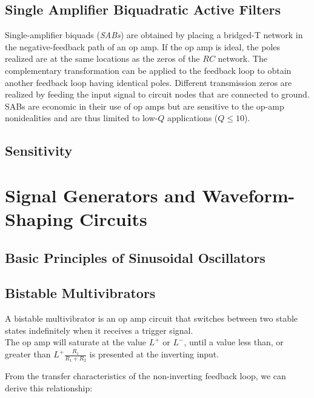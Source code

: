 \documentclass[11pt]{article}
\begin{document}
    \subsection{Single Amplifier Biquadratic Active Filters}

    Single-amplifier biquads (\textit{SABs}) are obtained by placing a bridged-T network in the negative-feedback path of an op amp. If the op amp is ideal, the poles realized are at the same locations as the zeros of the $RC$ network. The complementary transformation can be applied to the feedback loop to obtain another feedback loop having identical poles. Different transmission zeros are realized by feeding the input signal to circuit nodes that are connected to ground. SABs are economic in their use of op amps but are sensitive to the op-amp nonidealities and
    are thus limited to low-$Q$ applications ($Q \leq 10$).

    \subsection{Sensitivity}


    \section{Signal Generators and Waveform-Shaping Circuits}



    \subsection{Basic Principles of Sinusoidal Oscillators}
    
    \subsection{Bistable Multivibrators}
    A bistable multivibrator is an op amp circuit that switches between two stable states indefinitely when it receives a trigger signal. \\
    
    The op amp will saturate at the value $L^+$ or $L^-$, until a value less than, or greater than $L^+\frac{R_1}{R_1+R_2}$ is presented at the inverting input.

    From the transfer characteristics of the non-inverting feedback loop, we can derive this relationship:
\end{document}
